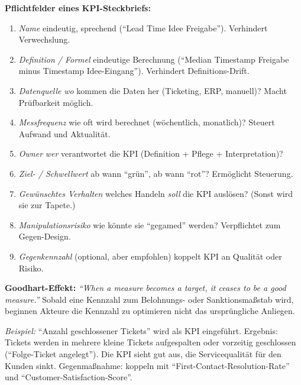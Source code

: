 \documentclass[11pt,a4paper,oneside]{article}
\begin{document}
\begin{loesungbox}
\textbf{Pflichtfelder eines KPI-Steckbriefs:}

\begin{enumerate}
  \item \emph{Name} \textendash{} eindeutig, sprechend (``Lead Time Idee\,\textrightarrow{}\,Freigabe''). Verhindert Verwechslung.
  \item \emph{Definition / Formel} \textendash{} eindeutige Berechnung (``Median Timestamp Freigabe minus Timestamp Idee-Eingang''). Verhindert Definitions-Drift.
  \item \emph{Datenquelle} \textendash{} \emph{wo} kommen die Daten her (Ticketing, ERP, manuell)? Macht Pr\"ufbarkeit m\"oglich.
  \item \emph{Messfrequenz} \textendash{} wie oft wird berechnet (w\"ochentlich, monatlich)? Steuert Aufwand und Aktualit\"at.
  \item \emph{Owner} \textendash{} \emph{wer} verantwortet die KPI (Definition + Pflege + Interpretation)?
  \item \emph{Ziel- / Schwellwert} \textendash{} ab wann ``gr\"un'', ab wann ``rot''? Erm\"oglicht Steuerung.
  \item \emph{Gew\"unschtes Verhalten} \textendash{} welches Handeln \emph{soll} die KPI ausl\"osen? (Sonst wird sie zur Tapete.)
  \item \emph{Manipulationsrisiko} \textendash{} wie k\"onnte sie ``gegamed'' werden? Verpflichtet zum Gegen-Design.
  \item \emph{Gegenkennzahl} (optional, aber empfohlen) \textendash{} koppelt KPI an Qualit\"at oder Risiko.
\end{enumerate}

\smallskip
\textbf{Goodhart-Effekt:}
\emph{``When a measure becomes a target, it ceases to be a good measure.''} Sobald eine Kennzahl zum Belohnungs- oder Sanktionsma{\ss}stab wird, beginnen Akteure die Kennzahl zu optimieren \textendash{} nicht das urspr\"ungliche Anliegen.

\smallskip
\emph{Beispiel:} ``Anzahl geschlossener Tickets'' wird als KPI eingef\"uhrt. Ergebnis: Tickets werden in mehrere kleine Tickets aufgespalten oder vorzeitig geschlossen (``Folge-Ticket angelegt''). Die KPI sieht gut aus, die Servicequalit\"at f\"ur den Kunden sinkt. Gegenma{\ss}nahme: koppeln mit ``First-Contact-Resolution-Rate'' und ``Customer-Satisfaction-Score''.
\end{loesungbox}

\clearpage
\end{document}
